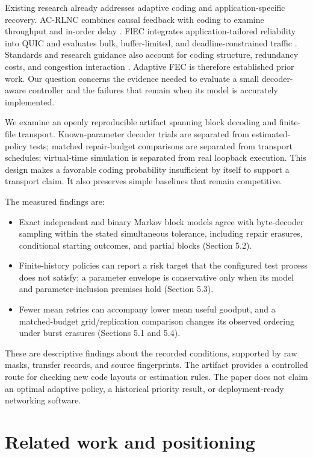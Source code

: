 \documentclass[11pt,a4paper]{article}
\begin{document}
Existing research already addresses adaptive coding and application-specific recovery. AC-RLNC combines causal feedback with coding to examine throughput and in-order delay \cite{cohen2020adaptive}. FlEC integrates application-tailored reliability into QUIC and evaluates bulk, buffer-limited, and deadline-constrained traffic \cite{michel2023flec}. Standards and research guidance also account for coding structure, redundancy costs, and congestion interaction \cite{roca2020rlc,uberti2021webrtc,kuhn2022congestion}. Adaptive FEC is therefore established prior work. Our question concerns the evidence needed to evaluate a small decoder-aware controller and the failures that remain when its model is accurately implemented.

We examine an openly reproducible artifact spanning block decoding and finite-file transport. Known-parameter decoder trials are separated from estimated-policy tests; matched repair-budget comparisons are separated from transport schedules; virtual-time simulation is separated from real loopback execution. This design makes a favorable coding probability insufficient by itself to support a transport claim. It also preserves simple baselines that remain competitive.

The measured findings are:

\begin{itemize}
\item Exact independent and binary Markov block models agree with byte-decoder sampling within the stated simultaneous tolerance, including repair erasures, conditional starting outcomes, and partial blocks (Section 5.2).
\item Finite-history policies can report a risk target that the configured test process does not satisfy; a parameter envelope is conservative only when its model and parameter-inclusion premises hold (Section 5.3).
\item Fewer mean retries can accompany lower mean useful goodput, and a matched-budget grid/replication comparison changes its observed ordering under burst erasures (Sections 5.1 and 5.4).
\end{itemize}
These are descriptive findings about the recorded conditions, supported by raw masks, transfer records, and source fingerprints. The artifact provides a controlled route for checking new code layouts or estimation rules. The paper does not claim an optimal adaptive policy, a historical priority result, or deployment-ready networking software.

\section{Related work and positioning}
\end{document}
